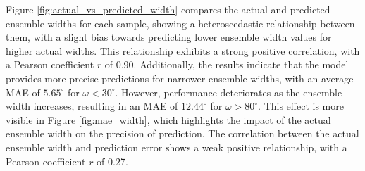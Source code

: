 \documentclass[11pt]{article}
\begin{document}
Figure \ref{fig:actual_vs_predicted_width} compares the actual and predicted ensemble widths for each sample, showing a heteroscedastic relationship between them, with a slight bias towards predicting lower ensemble width values for higher actual widths. This relationship exhibits a strong positive correlation, with a Pearson coefficient $r$ of 0.90. Additionally, the results indicate that the model provides more precise predictions for narrower ensemble widths, with an average MAE of $5.65^\circ$ for $\omega < 30^\circ$. However, performance deteriorates as the ensemble width increases, resulting in an MAE of $12.44^\circ$ for $\omega > 80^\circ$. This effect is more visible in Figure \ref{fig:mae_width}, which highlights the impact of the actual ensemble width on the precision of prediction. The correlation between the actual ensemble width and prediction error shows a weak positive relationship, with a Pearson coefficient $r$ of 0.27.
\end{document}
